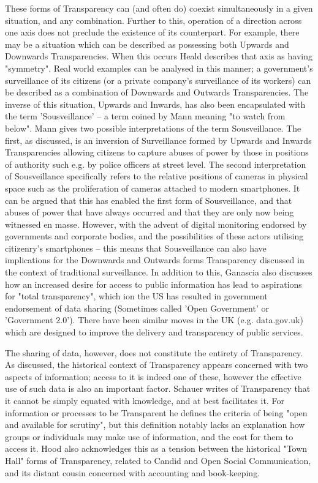 These forms of Transparency can (and often do) coexist simultaneously in a given situation, and any combination. Further to this, operation of a direction across one axis does not preclude the existence of its counterpart. For example, there may be a situation which can be described as possessing both Upwards and Downwards Transparencies. When this occurs Heald describes that axis as having "symmetry". Real world examples can be analysed in this manner; a government's surveillance of its citizens (or a private company's surveillance of its workers) can be described as a combination of Downwards and Outwards Transparencies. The inverse of this situation, Upwards and Inwards, has also been encapsulated with the term 'Sousveillance' -- a term coined by Mann meaning "to watch from below". Mann gives two possible interpretations of the term Sousveillance. The first, as discussed, is an inversion of Surveillance formed by Upwards and Inwards Transparencies allowing citizens to capture abuses of power by those in positions of authority such e.g. by police officers at street level. The second interpretation of Sousveillance specifically refers to the relative positions of cameras in physical space such as the proliferation of cameras attached to modern smartphones. It can be argued that this has enabled the first form of Sousveillance, and that abuses of power that have always occurred and that they are only now being witnessed en masse. However, with the advent of digital monitoring endorsed by governments and corporate bodies, and the possibilities of these actors utilising citizenry's smartphones -- this means that Sousveillance can also have implications for the Downwards and Outwards forms Transparency discussed in the context of traditional surveillance. In addition to this, Ganascia also discusses how an increased desire for access to public information has lead to aspirations for "total transparency", which ion the US has resulted in government endorsement of data sharing (Sometimes called 'Open Government' or 'Government 2.0'). There have been similar moves in the UK (e.g. data.gov.uk) which are designed to improve the delivery and transparency of public services.

The sharing of data, however, does not constitute the entirety of Transparency. As discussed, the historical context of Transparency appears concerned with two aspects of information; access to it is indeed one of these, however the effective use of such data is also an important factor. Schauer writes of Transparency that it cannot be simply equated with knowledge, and at best facilitates it. For information or processes to be Transparent he defines the criteria of being "open and available for scrutiny", but this definition notably lacks an explanation how groups or individuals may make use of information, and the cost for them to access it. Hood also acknowledges this as a tension between the historical "Town Hall" forms of Transparency, related to Candid and Open Social Communication, and its distant cousin concerned with accounting and book-keeping.

